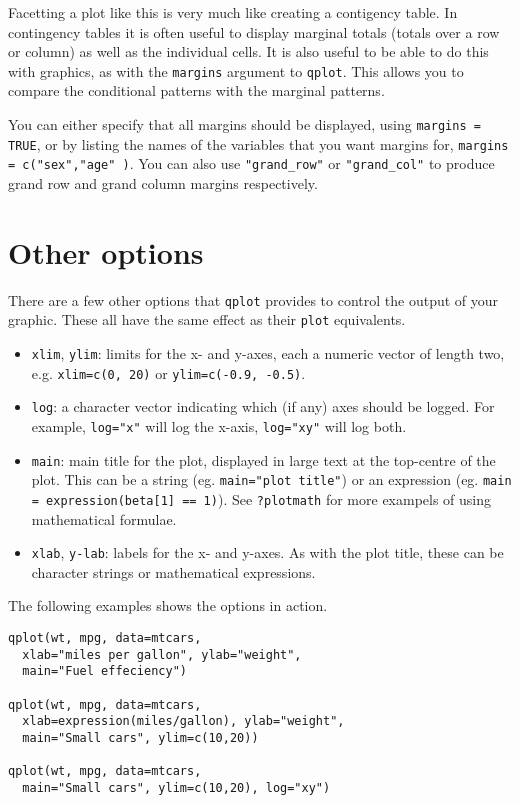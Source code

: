 Facetting a plot like this is very much like creating a contigency table.  In contingency tables it is often useful to display marginal totals (totals over a row or column) as well as the individual cells.  It is also useful to be able to do this with graphics, as with the {\tt margins} argument to {\tt qplot}.  This allows you to compare the conditional patterns with the marginal patterns.

You can either specify that all margins should be displayed, using {\tt margins = TRUE}, or by listing the names of the variables that you want margins for, {\tt margins = c("sex","age" )}.  You can also use {\tt "grand\_row"} or {\tt "grand\_col"} to produce grand row and grand column margins respectively.

\section{Other options}\label{sec:other_options}

There are a few other options that {\tt qplot} provides to control the output of your graphic.  These all have the same effect as their {\tt plot} equivalents.

\begin{itemize}
	\item {\tt xlim}, {\tt ylim}: limits for the x- and y-axes, each a numeric vector of length two, e.g. {\tt xlim=c(0, 20)} or {\tt ylim=c(-0.9, -0.5)}.
	\item {\tt log}: a character vector indicating which (if any) axes should be logged.  For example, {\tt log="x"} will log the x-axis, {\tt log="xy"} will log both.
	\item {\tt main}: main title for the plot, displayed in large text at the top-centre of the plot.  This can be a string (eg. {\tt main="plot title"}) or an expression (eg. {\tt main = expression(beta[1] == 1)}).  See {\tt ?plotmath} for more exampels of using mathematical formulae.
	\item {\tt xlab}, {\tt y-lab}: labels for the x- and y-axes.  As with the plot title, these can be character strings or mathematical expressions.
\end{itemize}

The following examples shows the options in action.

\begin{verbatim}
qplot(wt, mpg, data=mtcars, 
  xlab="miles per gallon", ylab="weight", 
  main="Fuel effeciency")

qplot(wt, mpg, data=mtcars, 
  xlab=expression(miles/gallon), ylab="weight", 
  main="Small cars", ylim=c(10,20))

qplot(wt, mpg, data=mtcars, 
  main="Small cars", ylim=c(10,20), log="xy")
\end{verbatim}

